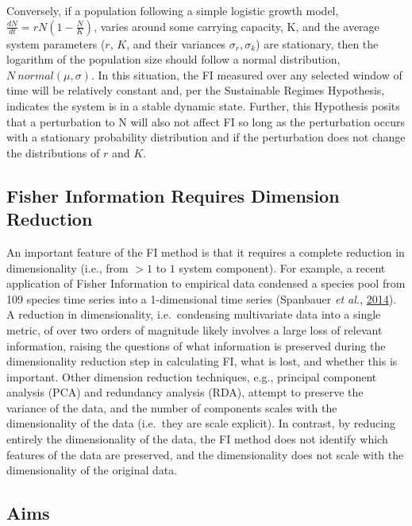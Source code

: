 \documentclass[12pt,twoside,openany]{reedthesis}
\begin{document}
Conversely, if a population following a simple logistic growth model, \(\frac{dN}{dt}=rN(1-\frac{N}{K})\), varies around some carrying capacity, K, and the average system parameters (\(r\), \(K\), and their variances \(\sigma_r, \sigma_k\)) are stationary, then the logarithm of the population size should follow a normal distribution, \(N ~ normal(\mu,\sigma)\). In this situation, the FI measured over any selected window of time will be relatively constant and, per the Sustainable Regimes Hypothesis, indicates the system is in a stable dynamic state. Further, this Hypothesis posits that a perturbation to N will also not affect FI so long as the perturbation occurs with a stationary probability distribution and if the perturbation does not change the distributions of \(r\) and \(K\).

\hypertarget{fisher-information-requires-dimension-reduction}{%
\subsection{Fisher Information Requires Dimension Reduction}\label{fisher-information-requires-dimension-reduction}}

An important feature of the FI method is that it requires a complete reduction in dimensionality (i.e., from \(>1\) to \(1\) system component). For example, a recent application of Fisher Information to empirical data condensed a species pool from 109 species time series into a 1-dimensional time series (Spanbauer \emph{et al.}, \protect\hyperlink{ref-spanbauer_prolonged_2014}{2014}). A reduction in dimensionality, i.e.~condensing multivariate data into a single metric, of over two orders of magnitude likely involves a large loss of relevant information, raising the questions of what information is preserved during the dimensionality reduction step in calculating FI, what is lost, and whether this is important. Other dimension reduction techniques, e.g., principal component analysis (PCA) and redundancy analysis (RDA), attempt to preserve the variance of the data, and the number of components scales with the dimensionality of the data (i.e.~they are scale explicit). In contrast, by reducing entirely the dimensionality of the data, the FI method does not identify which features of the data are preserved, and the dimensionality does not scale with the dimensionality of the original data.

\hypertarget{aims}{%
\subsection{Aims}\label{aims}}
\end{document}
